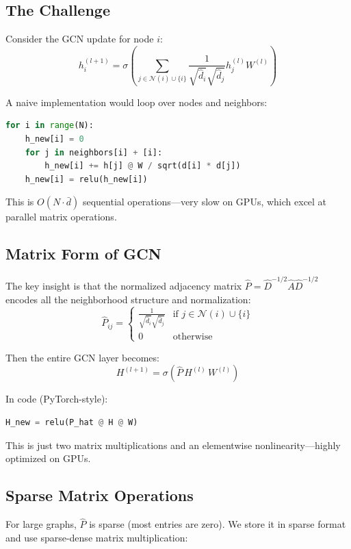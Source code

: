 \begin{notechapter}
\subsection{The Challenge}

Consider the GCN update for node $i$:
\[
h_i^{(l+1)} = \sigma\left( \sum_{j \in \mathcal{N}(i) \cup \{i\}} 
    \frac{1}{\sqrt{\hat{d}_i}\sqrt{\hat{d}_j}} h_j^{(l)} W^{(l)} \right)
\]

A naive implementation would loop over nodes and neighbors:
\begin{lstlisting}[style=pythonstyle, language=Python]
for i in range(N):
    h_new[i] = 0
    for j in neighbors[i] + [i]:
        h_new[i] += h[j] @ W / sqrt(d[i] * d[j])
    h_new[i] = relu(h_new[i])
\end{lstlisting}

This is $O(N \cdot \bar{d})$ sequential operations---very slow on GPUs, 
which excel at parallel matrix operations.

\subsection{Matrix Form of GCN}

The key insight is that the normalized adjacency matrix 
$\hat{P} = \hat{D}^{-1/2} \hat{A} \hat{D}^{-1/2}$ encodes all the 
neighborhood structure and normalization:
\[
\hat{P}_{ij} = \begin{cases}
\frac{1}{\sqrt{\hat{d}_i}\sqrt{\hat{d}_j}} & \text{if } j \in \mathcal{N}(i) \cup \{i\} \\
0 & \text{otherwise}
\end{cases}
\]

Then the entire GCN layer becomes:
\[
H^{(l+1)} = \sigma\left( \hat{P} \, H^{(l)} \, W^{(l)} \right)
\]

In code (PyTorch-style):
\begin{lstlisting}[style=pythonstyle, language=Python]
H_new = relu(P_hat @ H @ W)
\end{lstlisting}

This is just two matrix multiplications and an elementwise nonlinearity---highly 
optimized on GPUs.

\subsection{Sparse Matrix Operations}

For large graphs, $\hat{P}$ is sparse (most entries are zero). We store 
it in sparse format and use sparse-dense matrix multiplication:


\end{notechapter}
